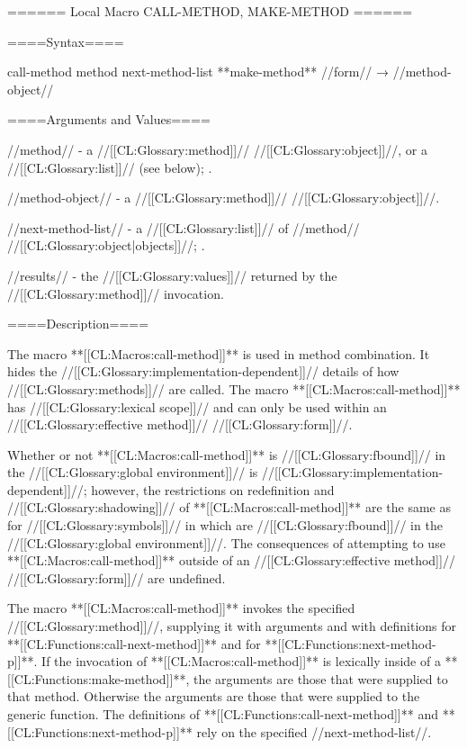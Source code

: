 ====== Local Macro CALL-METHOD, MAKE-METHOD ======

====Syntax====

\DefmacWithValues call-method {method {\optional} next-method-list} {} **make-method** //form// → //method-object//

====Arguments and Values====


//method// - a //[[CL:Glossary:method]]// //[[CL:Glossary:object]]//, or a //[[CL:Glossary:list]]// (see below); \noeval.

//method-object// - a //[[CL:Glossary:method]]// //[[CL:Glossary:object]]//.

//next-method-list// - a //[[CL:Glossary:list]]// of //method// //[[CL:Glossary:object|objects]]//; \noeval.

//results// - the //[[CL:Glossary:values]]// returned by the //[[CL:Glossary:method]]// invocation.

====Description====

The macro **[[CL:Macros:call-method]]** is used in method combination. It hides the //[[CL:Glossary:implementation-dependent]]// details of how //[[CL:Glossary:methods]]// are called. The macro **[[CL:Macros:call-method]]** has //[[CL:Glossary:lexical scope]]// and can only be used within an //[[CL:Glossary:effective method]]// //[[CL:Glossary:form]]//.


Whether or not **[[CL:Macros:call-method]]** is //[[CL:Glossary:fbound]]// in the //[[CL:Glossary:global environment]]// is //[[CL:Glossary:implementation-dependent]]//; however, the restrictions on redefinition and //[[CL:Glossary:shadowing]]// of **[[CL:Macros:call-method]]** are the same as for //[[CL:Glossary:symbols]]// in  which are //[[CL:Glossary:fbound]]// in the //[[CL:Glossary:global environment]]//. The consequences of attempting to use **[[CL:Macros:call-method]]** outside of an //[[CL:Glossary:effective method]]// //[[CL:Glossary:form]]// are undefined.


The macro **[[CL:Macros:call-method]]** invokes the specified //[[CL:Glossary:method]]//, supplying it with arguments and with definitions for **[[CL:Functions:call-next-method]]** and for **[[CL:Functions:next-method-p]]**. If the invocation of **[[CL:Macros:call-method]]** is lexically inside of a **[[CL:Functions:make-method]]**, the arguments are those that were supplied to that method. Otherwise the arguments are those that were supplied to the generic function. The definitions of **[[CL:Functions:call-next-method]]** and **[[CL:Functions:next-method-p]]** rely on the specified //next-method-list//.

